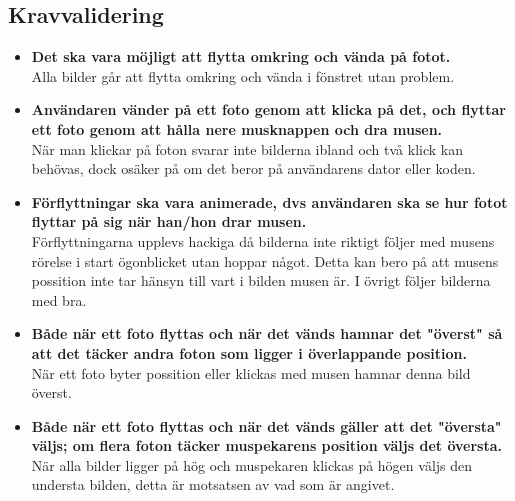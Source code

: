\documentclass[hidelinks]{article}
\begin{document}
\subsection*{Kravvalidering}
\begin{itemize}
\item \textbf{Det ska vara möjligt att flytta omkring och vända på fotot.}
\\Alla bilder går att flytta omkring och vända i fönstret utan problem.
\item \textbf{Användaren vänder på ett foto genom att klicka på det, och flyttar ett foto genom att hålla nere musknappen och dra musen.}
\\När man klickar på foton svarar inte bilderna ibland och två klick kan behövas, dock osäker på om det beror på användarens dator eller koden.
\item \textbf{Förflyttningar ska vara animerade, dvs användaren ska se hur fotot flyttar på sig när han/hon drar musen.}
\\Förflyttningarna upplevs hackiga då bilderna inte riktigt följer med musens rörelse i start ögonblicket utan hoppar något. Detta kan bero på att musens possition inte tar hänsyn till vart i bilden musen är.
I övrigt följer bilderna med bra.
\item \textbf{Både när ett foto flyttas och när det vänds hamnar det "överst" så att det täcker andra foton som ligger i överlappande position.}
\\När ett foto byter possition eller klickas med musen hamnar denna bild överst.
\item \textbf{Både när ett foto flyttas och när det vänds gäller att det "översta" väljs; om flera foton täcker muspekarens position väljs det översta.}
\\När alla bilder ligger på hög och muspekaren klickas på högen väljs den understa bilden, detta är motsatsen av vad som är angivet.
\end{itemize}
\end{document}
